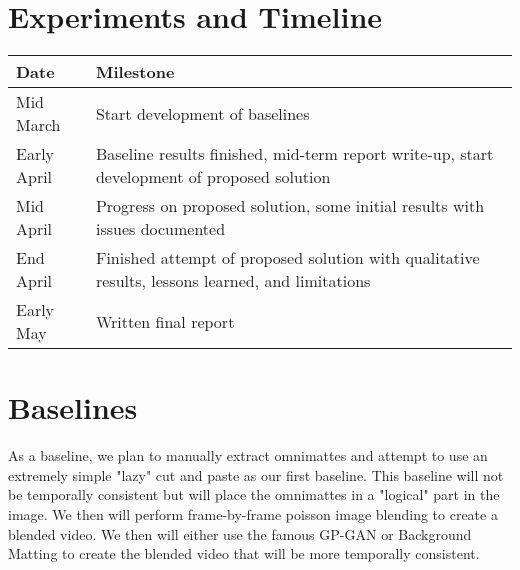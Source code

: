 \documentclass{article}
\begin{document}
\section{Experiments and Timeline}
\begin{center}
\begin{tabular}{|| p{2cm} | p{12cm} ||}
    \hline
    \textbf{Date} & \textbf{Milestone} \\
    \hline
    Mid March & Start development of baselines \\
    \hline
    Early April & Baseline results finished, mid-term report write-up, start development of proposed solution \\
    \hline
    Mid April & Progress on proposed solution, some initial results with issues documented \\
    \hline
    End April & Finished attempt of proposed solution with qualitative results, lessons learned, and limitations\\
    \hline
    Early May & Written final report \\
    \hline
\end{tabular}
\end{center}

\section{Baselines}
As a baseline, we plan to manually extract omnimattes and attempt to use an extremely simple "lazy" cut and paste as our first baseline. This baseline will not be temporally consistent but will place the omnimattes in a "logical" part in the image. We then will perform frame-by-frame poisson image blending to create a blended video. We then will either use the famous GP-GAN\cite{10.1145/3343031.3350944} or Background Matting \cite{BMSengupta20} to create the blended video that will be more temporally consistent.


\printbibliography
\end{document}
